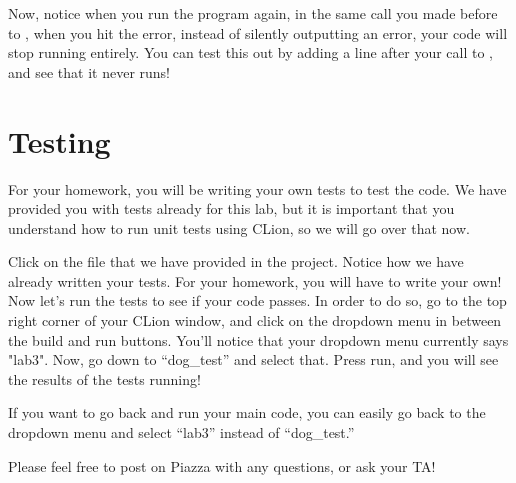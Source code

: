 \documentclass{tufte-handout}
\begin{document}
Now, notice when you run the program again, in the same call you made before to , when you hit the error, instead of silently outputting an error, your code will stop running entirely.  
You can test this out by adding a  line after your call to , and see that it never runs! 

\section{Testing}


For your homework, you will be writing your own tests to test the code.  We have provided you with tests already for this lab, but it is important that you understand how to run unit tests using CLion, so we will go over that now.

Click on the  file that we have provided in the project.  
Notice how we have already written your tests.  For your homework, you will have to write your own!
Now let's run the tests to see if your code passes.
In order to do so, go to the top right corner of your CLion window, and click on the dropdown menu in between the build and run buttons.
You'll notice that your dropdown menu currently says "lab3".
Now, go down to ``dog\_test'' and select that.
Press run, and you will see the results of the tests running!


If you want to go back and run your main code, you can easily go back to
the dropdown menu and select ``lab3'' instead of ``dog\_test.''

Please feel free to post on Piazza with any questions, or ask your TA!  
\end{document}
